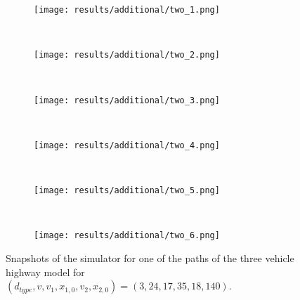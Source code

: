 \begin{figure}[H]
\centering
\begin{subfigure}{0.75\textwidth}
  \centering
  \texttt{[image: results/additional/two\_1.png]}
\end{subfigure}\\ \vspace{2px}
\begin{subfigure}{0.75\textwidth}
  \centering
  \texttt{[image: results/additional/two\_2.png]}
\end{subfigure} \\ \vspace{2px}
\begin{subfigure}{0.75\textwidth}
  \centering
  \texttt{[image: results/additional/two\_3.png]}
\end{subfigure} \\ \vspace{2px}
\begin{subfigure}{0.75\textwidth}
  \centering
  \texttt{[image: results/additional/two\_4.png]}
\end{subfigure} \\ \vspace{2px}
\begin{subfigure}{0.75\textwidth}
  \centering
  \texttt{[image: results/additional/two\_5.png]}
\end{subfigure} \\ \vspace{2px}
\begin{subfigure}{0.75\textwidth}
  \centering
  \texttt{[image: results/additional/two\_6.png]}
\end{subfigure}
\caption{Snapshots of the simulator for one of the paths of the three vehicle highway model for $(d_{type}, v, v_1, x_{1,0}, v_2, x_{2,0}) = (3, 24, 17, 35, 18, 140)$.}
\label{fig:three_vehicle_sim}
\end{figure}





